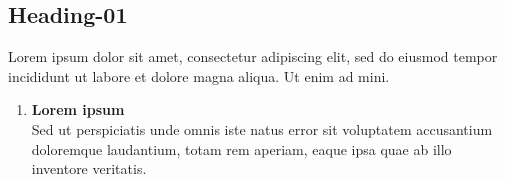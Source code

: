 \documentclass[a4paper, 12pt]{article} %
\begin{document}
\makeatletter

\newlength{\Page@FrameHeight}
\newlength{\Page@FrameWidth}

\AddToShipoutPicture{
  \thinlines
  \setlength{\Page@FrameHeight}{\paperheight-\PageFrameTopMargin-\PageFrameBottomMargin}
  \setlength{\Page@FrameWidth}{\paperwidth-\PageFrameLeftMargin-\PageFrameRightMargin}
  \put(\strip@pt\PageFrameLeftMargin,\strip@pt\PageFrameTopMargin){
    \framebox(\strip@pt\Page@FrameWidth, \strip@pt\Page@FrameHeight){}}}

\makeatother
\pagebreak
\subsection*{Heading-01}
Lorem ipsum dolor sit amet, consectetur adipiscing elit, sed do eiusmod tempor incididunt ut labore et dolore magna aliqua. Ut enim ad mini.
\begin{enumerate}
\item \textbf{Lorem ipsum }\\Sed ut perspiciatis unde omnis iste natus error sit voluptatem accusantium doloremque laudantium, totam rem aperiam, eaque ipsa quae ab illo inventore veritatis.

\end{enumerate}
\end{document}
